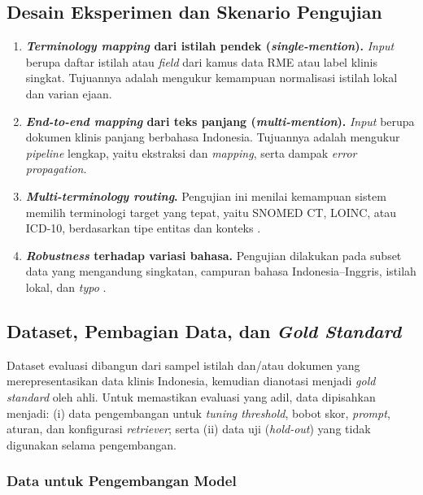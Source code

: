 \subsection{Desain Eksperimen dan Skenario Pengujian}

\begin{enumerate}
    \item \textbf{\textit{Terminology mapping} dari istilah pendek (\textit{single-mention}).} \textit{Input} berupa daftar istilah atau \textit{field} dari kamus data RME atau label klinis singkat. Tujuannya adalah mengukur kemampuan normalisasi istilah lokal dan varian ejaan.
    \item \textbf{\textit{End-to-end mapping} dari teks panjang (\textit{multi-mention}).} \textit{Input} berupa dokumen klinis panjang berbahasa Indonesia. Tujuannya adalah mengukur \textit{pipeline} lengkap, yaitu ekstraksi dan \textit{mapping}, serta dampak \textit{error propagation}.
    \item \textbf{\textit{Multi-terminology routing}.} Pengujian ini menilai kemampuan sistem memilih terminologi target yang tepat, yaitu SNOMED CT, LOINC, atau ICD-10, berdasarkan tipe entitas dan konteks \citep{ayuningtyas_bringing_2025}.
    \item \textbf{\textit{Robustness} terhadap variasi bahasa.} Pengujian dilakukan pada subset data yang mengandung singkatan, campuran bahasa Indonesia--Inggris, istilah lokal, dan \textit{typo} \citep{purwitasari_comparison_2023}.
\end{enumerate}

\subsection{Dataset, Pembagian Data, dan \textit{Gold Standard}}

Dataset evaluasi dibangun dari sampel istilah dan/atau dokumen yang merepresentasikan data klinis Indonesia, kemudian dianotasi menjadi \textit{gold standard} oleh ahli. Untuk memastikan evaluasi yang adil, data dipisahkan menjadi: (i) data pengembangan untuk \textit{tuning threshold}, bobot skor, \textit{prompt}, aturan, dan konfigurasi \textit{retriever}; serta (ii) data uji (\textit{hold-out}) yang tidak digunakan selama pengembangan.

\subsubsection{Data untuk Pengembangan Model}

